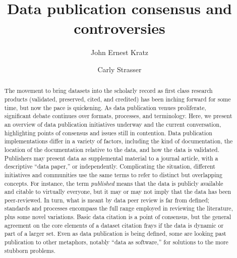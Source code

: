 \documentclass[10pt,a4paper,twocolumn]{article}
\begin{document}
\title{Data publication consensus and controversies}
\author[1]{John Ernest Kratz}
\author[1]{Carly Strasser}

\maketitle
\thispagestyle{fancy}


\begin{abstract}


The movement to bring datasets into the scholarly record as first class research products (validated, preserved, cited, and credited) has been inching forward for some time, but now the pace is quickening.
As data publication venues proliferate, significant debate continues over formats, processes, and terminology.
Here, we present an overview of data publication initiatives underway and the current conversation, highlighting points of consensus and issues still in contention.
Data publication implementations differ in a variety of factors, including the kind of documentation, the location of the documentation relative to the data, and how the data is validated.
Publishers may present data as supplemental material to a journal article, with a descriptive ``data paper,'' or independently.
Complicating the situation, different initiatives and communities use the same terms to refer to distinct but overlapping concepts.
For instance, the term \emph{published} means that the data is publicly available and citable to virtually everyone, but it may or may not imply that the data has been peer-reviewed.
In turn, what is meant by data peer review is far from defined; standards and processes encompass the full range employed in reviewing the literature, plus some novel variations.
Basic data citation is a point of consensus, but the general agreement on the core elements of a dataset citation frays if the data is dynamic or part of a larger set.
Even as data publication is being defined, some are looking past publication to other metaphors, notably ``data as software,'' for solutions to the more stubborn problems.

\end{abstract}
\clearpage
\end{document}
